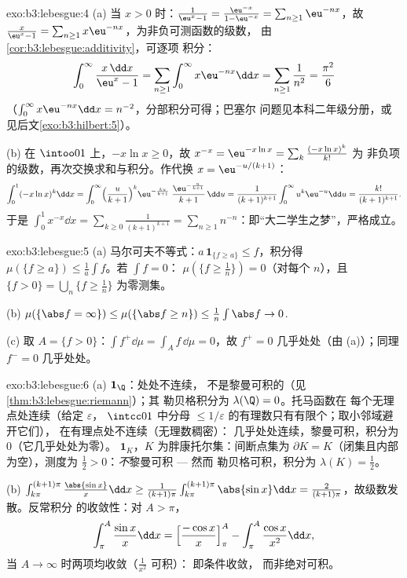 \begin{solution}{exo:b3:lebesgue:4}
(a) 当 $x > 0$ 时：$\frac1{\eu^x - 1} = \frac{\eu^{-x}}{1 -
\eu^{-x}} = \sum_{n\geq1}\eu^{-nx}$，故 $\frac{x}{\eu^x - 1} =
\sum_{n\geq1}x\eu^{-nx}$，为非负可测函数的级数，
由\cref{cor:b3:lebesgue:additivity}，可逐项
积分：
\[
\int_0^\infty\frac{x\,\dd x}{\eu^x - 1}
= \sum_{n\geq1}\int_0^\infty x\eu^{-nx}\dd x
= \sum_{n\geq1}\frac1{n^2} = \frac{\pi^2}6
\]
（$\int_0^\infty x\eu^{-nx}\dd x = n^{-2}$，分部积分可得；巴塞尔
问题见本科二年级分册，或见后文\cref{exo:b3:hilbert:5}）。

(b) 在 $\intoo01$ 上，$-x\ln x \geq 0$，故 $x^{-x} =
\eu^{-x\ln x} = \sum_k\frac{(-x\ln x)^k}{k!}$ 为
非负项的级数，再次交换求和与积分。作代换 $x =
\eu^{-u/(k+1)}$：
\[
\int_0^1(-x\ln x)^k\dd x
= \int_0^\infty\Bigl(\frac{u}{k+1}\Bigr)^{k}
\eu^{-\frac{ku}{k+1}}\;\frac{\eu^{-\frac u{k+1}}}{k+1}\,\dd u
= \frac{1}{(k+1)^{k+1}}\int_0^\infty u^k\eu^{-u}\dd u
= \frac{k!}{(k+1)^{k+1}} .
\]
于是 $\int_0^1x^{-x}\dd x = \sum_{k\geq0}\frac{1}{(k+1)^{k+1}}
= \sum_{n\geq1}n^{-n}$：即“大二学生之梦”，严格成立。
\end{solution}

\begin{solution}{exo:b3:lebesgue:5}
(a) 马尔可夫不等式：$a\,\mathbf 1_{\{f \geq a\}} \leq f$，积分得
$\mu(\{f \geq a\}) \leq \frac1a\int f$。若 $\int f = 0$：
$\mu(\{f \geq \frac1n\}) = 0$（对每个 $n$），且 $\{f > 0\} =
\bigcup_n\{f \geq \frac1n\}$ 为零测集。

(b) $\mu(\{\abs f = \infty\}) \leq \mu(\{\abs f \geq n\}) \leq
\frac1n\int\abs f \to 0$.

(c) 取 $A = \{f > 0\}$：$\int f^+\dd\mu = \int_Af\,\dd\mu =
0$，故 $f^+ = 0$ 几乎处处（由 (a)）；同理 $f^- = 0$ 几乎处处。
\end{solution}

\begin{solution}{exo:b3:lebesgue:6}
(a) $\mathbf 1_\Q$：处处不连续，
不是黎曼可积的（见\cref{thm:b3:lebesgue:riemann}）；其
勒贝格积分为 $\lambda(\Q) = 0$。托马函数在
每个无理点处连续（给定 $\varepsilon$，
$\intcc01$ 中分母 $\leq
1/\varepsilon$ 的有理数只有有限个；取小邻域避开它们），
在有理点处不连续（无理数稠密）：
几乎处处连续，黎曼可积，积分为 $0$（它几乎处处为零）。
$\mathbf 1_K$，$K$ 为胖康托尔集：间断点集为
$\partial K = K$（闭集且内部为空），测度为
$\frac12 > 0$：\emph{不}黎曼可积 --- 然而
勒贝格可积，积分为 $\lambda(K) = \frac12$。

(b) $\int_{k\pi}^{(k+1)\pi}\frac{\abs{\sin x}}x\dd x \geq
\frac1{(k+1)\pi}\int_{k\pi}^{(k+1)\pi}\abs{\sin x}\dd x =
\frac{2}{(k+1)\pi}$，故级数发散。反常积分
的收敛性：对 $A > \pi$，
\[
\int_\pi^A\frac{\sin x}x\dd x = \Bigl[\frac{-\cos
x}x\Bigr]_\pi^A - \int_\pi^A\frac{\cos x}{x^2}\dd x,
\]
当 $A \to \infty$ 时两项均收敛（$\frac1{x^2}$ 可积）：
即条件收敛，
而非绝对可积。
\end{solution}

